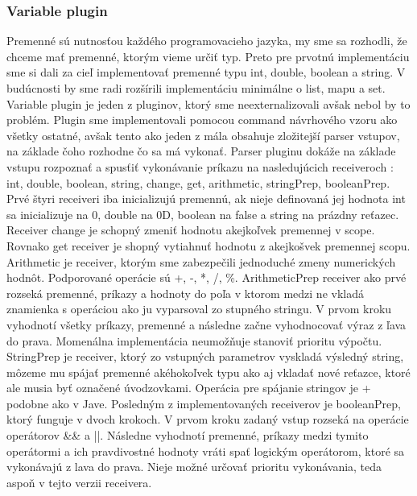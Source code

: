 \subsubsection{Variable plugin}
\indent Premenné sú nutnosťou každého programovacieho jazyka, my sme sa rozhodli, že chceme mať premenné, ktorým vieme určiť typ. Preto pre prvotnú implementáciu sme si dali za cieľ implementovať premenné typu int, double, boolean a string. V budúcnosti by sme radi rozšírili implementáciu minimálne o list, mapu a set. Variable plugin je jeden z pluginov, ktorý sme neexternalizovali avšak nebol by to problém. Plugin sme implementovali pomocou command návrhového vzoru ako všetky ostatné, avšak tento ako jeden z mála obsahuje zložitejší parser vstupov, na základe čoho rozhodne čo sa má vykonať. 
\newline 
\indent Parser pluginu dokáže na základe vstupu rozpoznať a spusťiť vykonávanie príkazu na nasledujúcich receiveroch : int, double, boolean, string, change, get, arithmetic, stringPrep, booleanPrep. 
\newline 
\indent Prvé štyri receiveri iba inicializujú premennú, ak nieje definovaná jej hodnota int sa inicializuje na 0, double na 0D, boolean na false a string na prázdny reťazec. 
\newline 
\indent Receiver change je schopný zmeniť hodnotu akejkoľvek premennej v scope. Rovnako get receiver je shopný vytiahnuť hodnotu z akejkošvek premennej scopu. 
\newline 
\indent Arithmetic je receiver, ktorým sme zabezpečili jednoduché zmeny numerických hodnôt. Podporované operácie sú +, -, *, /, \%. ArithmeticPrep receiver ako prvé rozseká premenné, príkazy a hodnoty do poľa v ktorom medzi ne vkladá znamienka s operáciou ako ju vyparsoval zo stupného stringu. V prvom kroku vyhodnotí všetky príkazy, premenné a následne začne vyhodnocovať výraz z ľava do prava. Momenálna implementácia neumožňuje stanoviť prioritu výpočtu. 
\newline 
\indent StringPrep je receiver, ktorý zo vstupných parametrov vyskladá výsledný string, môzeme mu spájať premenné akéhokoľvek typu ako aj vkladať nové reťazce, ktoré ale musia byť označené úvodzovkami. Operácia pre spájanie stringov je + podobne ako v Jave. 
\newline 
\indent Posledným z implementovaných receiverov je booleanPrep, ktorý funguje v dvoch krokoch. V prvom kroku zadaný vstup rozseká na operácie operátorov \&\& a ||. Následne vyhodnotí premenné, príkazy medzi tymito operátormi a ich pravdivostné hodnoty vráti spať logickým operátorom, ktoré sa vykonávajú z lava do prava. Nieje možné určovať prioritu vykonávania, teda aspoň v tejto verzii receivera.

